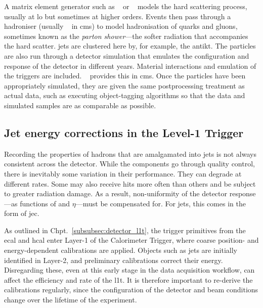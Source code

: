 A matrix element generator such as \madgraph~\cite{Alwall:2014hca} or \POWHEG~\cite{Nason:2004rx,Frixione:2007vw} models the hard scattering process, usually at \acrfull{lo} but sometimes at higher orders. Events then pass through a hadroniser (usually \PYTHIA~\cite{pythia82} in \acrshort{cms}) to model hadronisation of quarks and gluons, sometimes known as the \emph{parton shower}---the softer radiation that accompanies the hard scatter. \Glspl{jet} are clustered here by, for example, the \gls{antikt}. The particles are also run through a detector simulation that emulates the configuration and response of the detector in different years. Material interactions and emulation of the triggers are included. \GEANTfour~\cite{AGOSTINELLI2003250,1610988,ALLISON2016186} provides this in \acrshort{cms}. Once the particles have been appropriately simulated, they are given the same postprocessing treatment as actual data, such as executing object-tagging algorithms so that the data and simulated samples are as comparable as possible.




\subsection{Jet energy corrections in the Level-1 Trigger}
\label{subsec:detector_jecs}

Recording the properties of hadrons that are amalgamated into \glspl{jet} is not always consistent across the detector. While the components go through quality control, there is inevitably some variation in their performance. They can degrade at different rates. Some may also receive hits more often than others and be subject to greater radiation damage. As a result, non-uniformity of the detector response---as functions of \pt and $\eta$---must be compensated for. For \glspl{jet}, this comes in the form of \gls{jec}.

As outlined in Chpt.~\ref{subsubsec:detector_l1t}, the trigger primitives from the \acrshort{ecal} and \acrshort{hcal} enter Layer-1 of the Calorimeter Trigger, where coarse position- and energy-dependent calibrations are applied. Objects such as \glspl{jet} are initially identified in Layer-2, and preliminary calibrations correct their energy. Disregarding these, even at this early stage in the data acquisition workflow, can affect the efficiency and rate of the \acrlong{l1t}. It is therefore important to re-derive the calibrations regularly, since the configuration of the detector and beam conditions change over the lifetime of the experiment.

